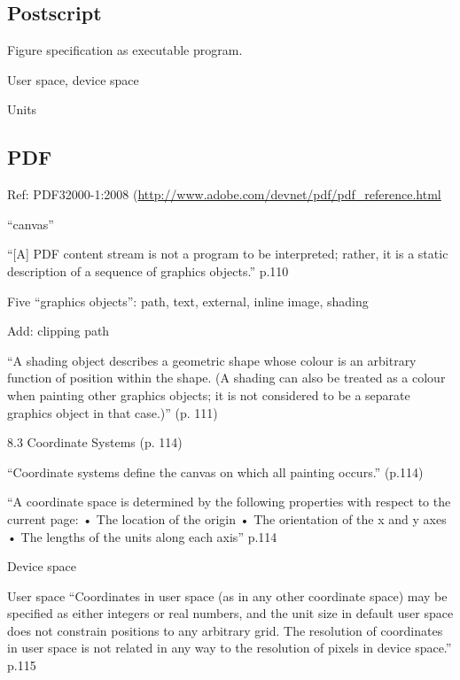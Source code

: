 \documentclass[12pt]{tufte-handout}
\numberwithin{equation}{subsection}
\numberwithin{equation}{subsection}
\begin{document}
\begin{appendices}
                \subsection{Postscript}

                Figure specification as executable program.

                User space, device space

                Units

                \subsection{PDF}

                Ref:  PDF32000-1:2008 (\url{http://www.adobe.com/devnet/pdf/pdf\_reference.html}

                ``canvas''

                ``[A] PDF content stream is not a program to be interpreted; rather, it is a static description of a sequence of graphics objects.'' p.110

                Five ``graphics objects'': path, text, external, inline image, shading

                Add: clipping path

                ``A shading object describes a geometric shape whose colour is an arbitrary function of position within the shape. (A shading can also be treated as a colour when painting other graphics objects; it is not considered to be a separate graphics object in that case.)'' (p. 111)


                8.3 Coordinate Systems (p. 114)

                ``Coordinate systems define the canvas on which all painting occurs.'' (p.114)

                ``A coordinate space is determined by the following properties with respect to the current page:
                • The location of the origin
                • The orientation of the x and y axes
                • The lengths of the units along each axis'' p.114

                Device space

                User space
                ``Coordinates in user space (as in any other coordinate space) may be specified as either integers or real numbers, and the unit size in default user space does not constrain positions to any arbitrary grid. The resolution of coordinates in user space is not related in any way to the resolution of pixels in device space.'' p.115


\end{appendices}
\end{document}

